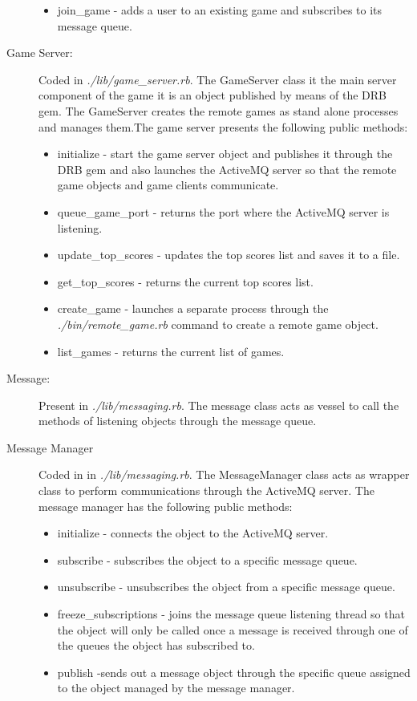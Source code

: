 \documentclass[a4paper,10pt,titlepage]{article}
\begin{document}
\begin{description}
\begin{itemize}
		\item join\_game - adds a user to an existing game and subscribes to its message queue. 
	\end{itemize}
	\item[Game Server:] Coded in \textit{./lib/game\_server.rb}. The GameServer class it the main server component of the game it is an object published by means of the DRB gem. The GameServer creates the remote games as stand alone processes and manages them.The game server presents the following public methods:
	\begin{itemize}
		\item initialize - start the game server object and publishes it through the DRB gem and also launches the ActiveMQ server so that the remote game objects and game clients communicate.
		\item queue\_game\_port - returns the port where the ActiveMQ server is listening. 
		\item update\_top\_scores - updates the top scores list and saves it to a file.
		\item get\_top\_scores - returns the current top scores list.
		\item create\_game - launches a separate process through the \textit{./bin/remote\_game.rb} command to create a remote game object.  
		\item list\_games - returns the current list of games.
	\end{itemize} 
	\item[Message:] Present in \textit{./lib/messaging.rb}. The message class acts as vessel to call the methods of listening objects through the message queue. 
	\item[Message Manager] Coded in in \textit{./lib/messaging.rb}. The MessageManager class acts as wrapper class to perform communications through the ActiveMQ server. The message manager has the following public methods:
	\begin{itemize}
		\item initialize - connects the object to the ActiveMQ server.
		\item subscribe - subscribes the object to a specific message queue.
		\item unsubscribe - unsubscribes the object from a specific message queue.
		\item freeze\_subscriptions - joins the message queue listening thread so that the object will only be called once a message is received through one of the queues the object has subscribed to. 
		\item publish -sends out a message object through the specific queue assigned to the object managed by the message manager.

\end{itemize}
\end{description}
\end{document}

